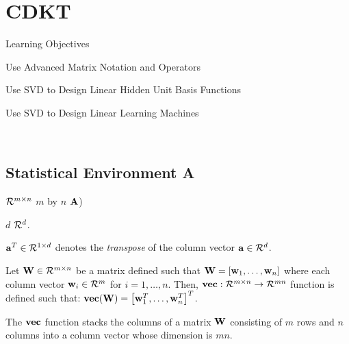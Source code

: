\chapter{CDKT}

\begin{shadowbox}{\begin{smlpage}{Learning Objectives}
\begin{large}
\begin{smlitemize}
\begin{item}
Use Advanced Matrix Notation and Operators
\end{item}
\begin{item}
Use SVD to Design Linear Hidden Unit Basis Functions
\end{item}
\begin{item}
Use SVD to Design Linear Learning Machines 
\end{item}
\end{smlitemize}
\end{large}
\end{smlpage}}\end{shadowbox} \\

\section{Statistical Environment A}

${\cal R}^{m \times n}$  $m$ by $n$  ${\bf A}$)  

 $d$ ${\cal R}^d$.



\begin{definition}
 ${\bf a}^T \in {\cal R}^{1 \times d}$ denotes the {\em transpose} of
the column vector ${\bf a} \in {\cal R}^{d}$.
\end{definition}

\begin{definition}[Q Matrix]
Let ${\bf W} \in {\cal R}^{m \times n}$ be a matrix defined such that
${\bf W} = [{\bf w}_1, \ldots, {\bf w}_n]$ where each
column vector ${\bf w}_i \in {\cal R}^m$
for $i = 1, \ldots, n$. Then, 
${\bf vec} : {\cal R}^{m \times n} \rightarrow {\cal R}^{mn}$ function
is defined such that: 
${\bf vec}({\bf W}) = \left[ {\bf w}_1^T, \ldots, {\bf w}_n^T \right]^T$.
\end{definition}

The ${\bf vec}$ function stacks the columns of a matrix ${\bf W}$ consisting
of $m$ rows and $n$ columns
into a column vector whose dimension is $mn$.

